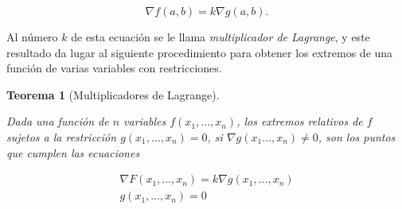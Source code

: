 \documentclass[
  a4paper,
]{scrreport}
\theoremstyle{definition}
\theoremstyle{plain}
\newtheorem{theorem}{Teorema}[chapter]
\theoremstyle{plain}
\theoremstyle{definition}
\theoremstyle{definition}
\theoremstyle{plain}
\theoremstyle{remark}
\begin{document}
\[
\nabla f(a,b) = k \nabla g(a,b).
\]

Al número \(k\) de esta ecuación se le llama \emph{multiplicador de
Lagrange}, y este resultado da lugar al siguiente procedimiento para
obtener los extremos de una función de varias variables con
restricciones.

\begin{theorem}[Multiplicadores de
Lagrange]\protect\hypertarget{thm-multiplicadores-lagrange}{}\label{thm-multiplicadores-lagrange}

Dada una función de \(n\) variables \(f(x_1,\ldots,x_n)\), los extremos
relativos de \(f\) sujetos a la restricción \(g(x_1,\ldots,x_n)=0\), si
\(\nabla g(x_1\ldots,x_n)\neq 0\), son los puntos que cumplen las
ecuaciones

\begin{align*}
\nabla F(x_1,\ldots,x_n) = k\nabla g(x_1,\ldots,x_n) \\
g(x_1,\ldots, x_n) = 0 
\end{align*}

\end{theorem}
\end{document}
